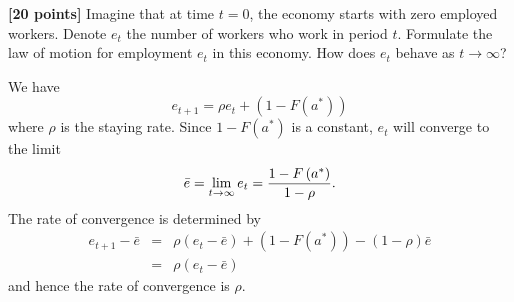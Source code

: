 \documentclass[11pt]{article}
\newenvironment{question}[1][Question]{}{}
\newenvironment{answer}[1][Answer]{}{}
\begin{document}
\begin{question}
\textbf{[20 points]} Imagine that at time $t=0$, the economy starts with
zero employed workers. Denote $e_{t}$ the number of workers who work in
period $t$. Formulate the law of motion for employment $e_{t}$ in this
economy. How does $e_{t}$ behave as $t\rightarrow \infty $?

\begin{answer}
We have%
\begin{equation*}
e_{t+1}=\rho e_{t}+\left( 1-F\left( a^{\ast }\right) \right)
\end{equation*}%
where $\rho $ is the staying rate. Since $1-F\left( a^{\ast }\right) $ is a
constant, $e_{t}$ will converge to the limit%
\begin{equation*}
\bar{e}=\lim_{t\rightarrow \infty }e_{t}=\frac{1-F\left( a^{\ast }\right) }{%
1-\rho }\text{.}
\end{equation*}%
The rate of convergence is determined by%
\begin{eqnarray*}
e_{t+1}-\bar{e} &=&\rho \left( e_{t}-\bar{e}\right) +\left( 1-F\left(
a^{\ast }\right) \right) -\left( 1-\rho \right) \bar{e} \\
&=&\rho \left( e_{t}-\bar{e}\right)
\end{eqnarray*}%
and hence the rate of convergence is $\rho $.
\end{answer}
\end{question}
\end{document}
